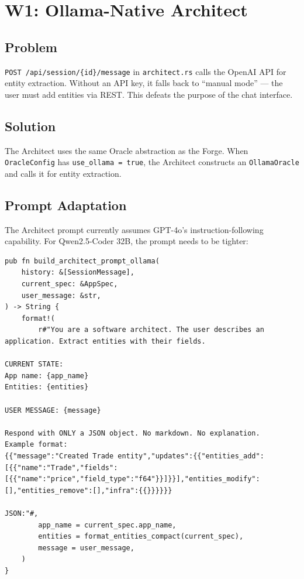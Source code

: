 \documentclass[11pt,a4paper]{article}
\begin{document}
\section{W1: Ollama-Native Architect}
\label{sec:w1}

\subsection{Problem}

\texttt{POST /api/session/\{id\}/message} in \texttt{architect.rs} 
calls the OpenAI API for entity extraction. Without an API key, it 
falls back to ``manual mode'' --- the user must add entities via 
REST. This defeats the purpose of the chat interface.

\subsection{Solution}

The Architect uses the same Oracle abstraction as the Forge. When 
\texttt{OracleConfig} has \texttt{use\_ollama = true}, the 
Architect constructs an \texttt{OllamaOracle} and calls it for 
entity extraction.

\subsection{Prompt Adaptation}

The Architect prompt currently assumes GPT-4o's instruction-following 
capability. For Qwen2.5-Coder 32B, the prompt needs to be tighter:

\begin{lstlisting}[style=rust]
pub fn build_architect_prompt_ollama(
    history: &[SessionMessage],
    current_spec: &AppSpec,
    user_message: &str,
) -> String {
    format!(
        r#"You are a software architect. The user describes an 
application. Extract entities with their fields.

CURRENT STATE:
App name: {app_name}
Entities: {entities}

USER MESSAGE: {message}

Respond with ONLY a JSON object. No markdown. No explanation.
Example format:
{{"message":"Created Trade entity","updates":{{"entities_add":[{{"name":"Trade","fields":[{{"name":"price","field_type":"f64"}}]}}],"entities_modify":[],"entities_remove":[],"infra":{{}}}}}}

JSON:"#,
        app_name = current_spec.app_name,
        entities = format_entities_compact(current_spec),
        message = user_message,
    )
}
\end{lstlisting}
\end{document}
